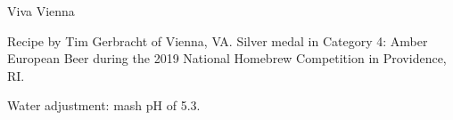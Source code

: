 \begin{recipe}{Viva Vienna}

\begin{aboutblock}
Recipe by Tim Gerbracht of Vienna, VA. Silver medal in Category 4: Amber European
Beer during the 2019 National Homebrew Competition in Providence, RI. \sourceaha
\end{aboutblock}


\begin{methodandtiming}
 
\begin{mashsteps}
\end{mashsteps}

\begin{fermentationsteps}
\end{fermentationsteps}

\begin{directions}
Water adjustment: mash pH of 5.3.
\end{directions}

\end{methodandtiming}

\recipebreak

\begin{ingredientsblock}

\begin{malts}
\end{malts}

\begin{hops}
\end{hops}


\end{ingredientsblock}

\end{recipe}
